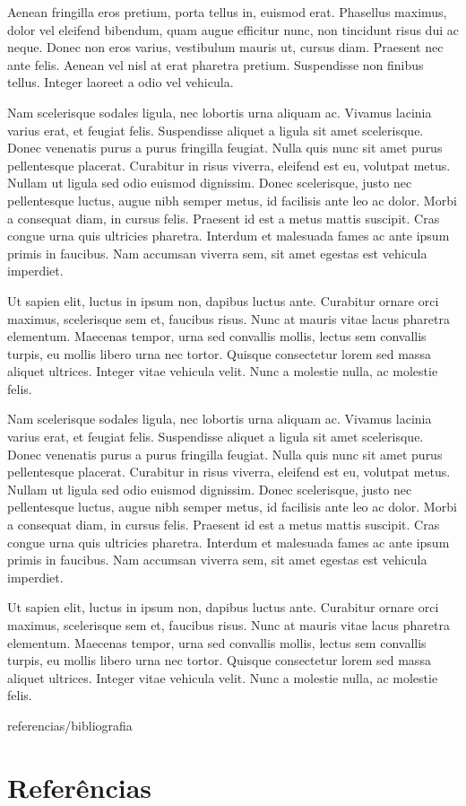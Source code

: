 \begin{btUnit}
Aenean fringilla eros pretium, porta tellus in, euismod erat.
Phasellus maximus, dolor vel eleifend bibendum, quam augue efficitur
nunc, non tincidunt risus dui ac neque. Donec non eros varius,
vestibulum mauris ut, cursus diam. Praesent nec ante felis. Aenean vel
nisl at erat pharetra pretium. Suspendisse non finibus tellus. Integer
laoreet a odio vel vehicula.

Nam scelerisque sodales ligula, nec lobortis urna aliquam ac. Vivamus
lacinia varius erat, et feugiat felis. Suspendisse aliquet a ligula
sit amet scelerisque. Donec venenatis purus a purus fringilla feugiat.
Nulla quis nunc sit amet purus pellentesque placerat. Curabitur in
risus viverra, eleifend est eu, volutpat metus. Nullam ut ligula sed
odio euismod dignissim. Donec scelerisque, justo nec pellentesque
luctus, augue nibh semper metus, id facilisis ante leo ac dolor. Morbi
a consequat diam, in cursus felis. Praesent id est a metus mattis
suscipit. Cras congue urna quis ultricies pharetra. Interdum et
malesuada fames ac ante ipsum primis in faucibus. Nam accumsan viverra
sem, sit amet egestas est vehicula imperdiet.

Ut sapien elit, luctus in ipsum non, dapibus luctus ante. Curabitur
ornare orci maximus, scelerisque sem et, faucibus risus. Nunc at
mauris vitae lacus pharetra elementum. Maecenas tempor, urna sed
convallis mollis, lectus sem convallis turpis, eu mollis libero urna
nec tortor. Quisque consectetur lorem sed massa aliquet ultrices.
Integer vitae vehicula velit. Nunc a molestie nulla, ac molestie
felis.

Nam scelerisque sodales ligula, nec lobortis urna aliquam ac. Vivamus
lacinia varius erat, et feugiat felis. Suspendisse aliquet a ligula
sit amet scelerisque. Donec venenatis purus a purus fringilla feugiat.
Nulla quis nunc sit amet purus pellentesque placerat. Curabitur in
risus viverra, eleifend est eu, volutpat metus. Nullam ut ligula sed
odio euismod dignissim. Donec scelerisque, justo nec pellentesque
luctus, augue nibh semper metus, id facilisis ante leo ac dolor. Morbi
a consequat diam, in cursus felis. Praesent id est a metus mattis
suscipit. Cras congue urna quis ultricies pharetra. Interdum et
malesuada fames ac ante ipsum primis in faucibus. Nam accumsan viverra
sem, sit amet egestas est vehicula imperdiet.

Ut sapien elit, luctus in ipsum non, dapibus luctus ante. Curabitur
ornare orci maximus, scelerisque sem et, faucibus risus. Nunc at
mauris vitae lacus pharetra elementum. Maecenas tempor, urna sed
convallis mollis, lectus sem convallis turpis, eu mollis libero urna
nec tortor. Quisque consectetur lorem sed massa aliquet ultrices.
Integer vitae vehicula velit. Nunc a molestie nulla, ac molestie
felis.

\begin{btSect}{referencias/bibliografia}
\section*{Referências}
\btPrintCited
\end{btSect}

\end{btUnit}